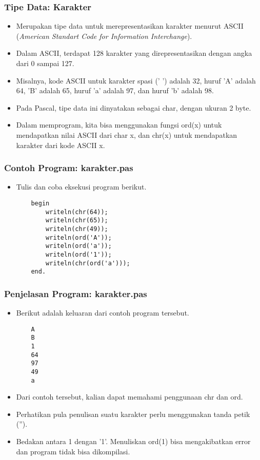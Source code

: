 \documentclass{beamer}
\begin{document}
\begin{frame}
\frametitle{Tipe Data: Karakter}
\begin{itemize}
	\item Merupakan tipe data untuk merepresentasikan karakter menurut ASCII (\textit{American Standart Code for Information Interchange}).
	\item Dalam ASCII, terdapat 128 karakter yang direpresentasikan dengan angka dari 0 sampai 127. 
	\item Misalnya, kode ASCII untuk karakter spasi (' ') adalah 32, huruf 'A' adalah 64, 'B' adalah 65, huruf 'a' adalah 97, dan huruf 'b' adalah 98.
	\item Pada Pascal, tipe data ini dinyatakan sebagai \alert{char}, dengan ukuran 2 byte.
	\item Dalam memprogram, kita bisa menggunakan fungsi ord(x) untuk mendapatkan nilai ASCII dari char x, dan chr(x) untuk mendapatkan karakter dari kode ASCII x.
\end{itemize}
\end{frame}

\begin{frame}[fragile]
\frametitle{Contoh Program: karakter.pas}
\begin{itemize}
	\item Tulis dan coba eksekusi program berikut.
	\begin{lstlisting}
	begin
	    writeln(chr(64));
	    writeln(chr(65));
	    writeln(chr(49));
	    writeln(ord('A'));
	    writeln(ord('a'));
	    writeln(ord('1'));
	    writeln(chr(ord('a')));
	end.
	\end{lstlisting}
\end{itemize}
\end{frame}

\begin{frame}[fragile]
\frametitle{Penjelasan Program: karakter.pas}
\begin{itemize}
	\item Berikut adalah keluaran dari contoh program tersebut.
	\begin{lstlisting}
	A
	B
	1
	64
	97
	49
	a
	\end{lstlisting}
	\item Dari contoh tersebut, kalian dapat memahami penggunaan chr dan ord.
	\item Perhatikan pula penulisan suatu karakter perlu menggunakan tanda petik ('').
	\item Bedakan antara 1 dengan '1'. Menuliskan ord(1) bisa mengakibatkan error dan program tidak bisa dikompilasi.
\end{itemize}
\end{frame}
\end{document}
